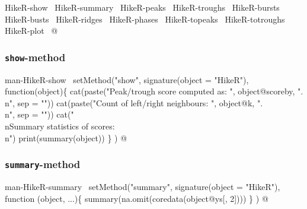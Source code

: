 \documentclass[a4paper]{article}
\begin{document}
\nwenddocs{}\endmoddef\let\nwnotused=\nwoutput{}
\LA{}HikeR-show~{\nwtagstyle{}}\RA{}
\LA{}HikeR-summary~{\nwtagstyle{}}\RA{}
\LA{}HikeR-peaks~{\nwtagstyle{}}\RA{}
\LA{}HikeR-troughs~{\nwtagstyle{}}\RA{}
\LA{}HikeR-bursts~{\nwtagstyle{}}\RA{}
\LA{}HikeR-busts~{\nwtagstyle{}}\RA{}
\LA{}HikeR-ridges~{\nwtagstyle{}}\RA{}
\LA{}HikeR-phases~{\nwtagstyle{}}\RA{}
\LA{}HikeR-topeaks~{\nwtagstyle{}}\RA{}
\LA{}HikeR-totroughs~{\nwtagstyle{}}\RA{}
\LA{}HikeR-plot~{\nwtagstyle{}}\RA{}
\nwnotused{HikerMethods.R}\nwendcode{}@

\subsubsection{\texttt{show}-method}

\nwenddocs{}\endmoddef
\LA{}man-HikeR-show~{\nwtagstyle{}}\RA{}
setMethod("show",
          signature(object = "HikeR"), function(object)\{
              cat(paste("Peak/trough score computed as: ",
                        object@scoreby, ".\\n", sep = ""))
              cat(paste("Count of left/right neighbours: ", object@k,
                        ".\\n", sep = ""))
              cat("\\nSummary statistics of scores:\\n")
              print(summary(object))
          \}
)
\nwendcode{}@

\subsubsection{\texttt{summary}-method}

\nwenddocs{}\endmoddef
\LA{}man-HikeR-summary~{\nwtagstyle{}}\RA{}
setMethod("summary",
          signature(object = "HikeR"),
          function (object, ...)\{
              summary(na.omit(coredata(object@ys[, 2])))
          \}
)
\nwendcode{}@
\end{document}
